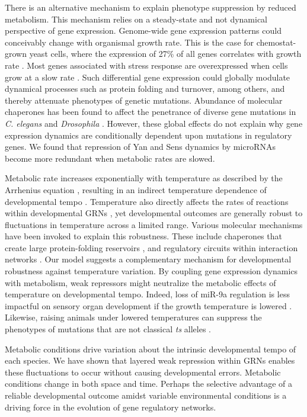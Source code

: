 There is an alternative mechanism to explain phenotype suppression by reduced metabolism. This mechanism relies on a steady-state and not dynamical perspective of gene expression. Genome-wide gene expression patterns could conceivably change with organismal growth rate. This is the case for chemostat-grown yeast cells, where the expression of 27\% of all genes correlates with growth rate \cite{Brauer2008}. Most genes associated with stress response are overexpressed when cells grow at a slow rate \cite{Brauer2008,Lu2009}. Such differential gene expression could globally modulate dynamical processes such as protein folding and turnover, among others, and thereby attenuate phenotypes of genetic mutations. Abundance of molecular chaperones has been found to affect the penetrance of diverse gene mutations in \textit{C. elegans} and \textit{Drosophila} \cite{Casanueva2012,Rutherford1998}. However, these global effects do not explain why gene expression dynamics are conditionally dependent upon mutations in regulatory genes. We found that repression of Yan and Sens dynamics by microRNAs become more redundant when metabolic rates are slowed.

Metabolic rate increases exponentially with temperature as described by the Arrhenius equation \cite{Zuo2011}, resulting in an indirect temperature dependence of developmental tempo \cite{Gillooly2002}. Temperature also directly affects the rates of reactions within developmental GRNs \cite{Zuo2011}, yet developmental outcomes are generally robust to fluctuations in temperature across a limited range. Various molecular mechanisms have been invoked to explain this robustness. These include chaperones that create large protein-folding reservoirs \cite{Jarosz2010,Rutherford1998}, and regulatory circuits within interaction networks \cite{Li2009b}. Our model suggests a complementary mechanism for developmental robustness against temperature variation. By coupling gene expression dynamics with metabolism, weak repressors might neutralize the metabolic effects of temperature on developmental tempo. Indeed, loss of miR-9a regulation is less impactful on sensory organ development if the growth temperature is lowered \cite{Cassidy2013}. Likewise, raising animals under lowered temperatures can suppress the phenotypes of mutations that are not classical \textit{ts} alleles \cite{Child1935,Krafka1920,Lewis1980,Villee1943}.

Metabolic conditions drive variation about the intrinsic developmental tempo of each species. We have shown that layered weak repression within GRNs enables these fluctuations to occur without causing developmental errors. Metabolic conditions change in both space and time. Perhaps the selective advantage of a reliable developmental outcome amidst variable environmental conditions is a driving force in the evolution of gene regulatory networks.


